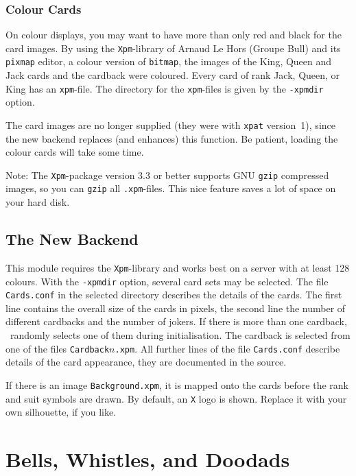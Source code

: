 \subsubsection*{Colour Cards}
On colour displays, you may want to have more than only red and black for the
card images. By using the {\tt Xpm}-library of Arnaud Le Hors (Groupe Bull)
and its {\tt pixmap} editor, a colour version of {\tt bitmap}, the images
of the King, Queen and Jack cards and the cardback were coloured.
Every card of rank Jack, Queen, or King has an {\tt xpm}-file.
The directory for the {\tt xpm}-files is given by the {\tt -xpmdir}
option.

The card images are no longer supplied (they were with {\tt xpat} version~1),
since the new backend replaces (and enhances) this function.
Be patient, loading the colour cards will take some time.

Note: The {\tt Xpm}-package version 3.3 or better
supports GNU {\tt gzip} compressed images, so you can {\tt gzip} all
{\tt .xpm}-files.
This nice feature saves a lot of space on your hard disk.


\subsection{The New Backend}
This module requires the {\tt Xpm}-library and works best on a server
with at least 128 colours. With the {\tt -xpmdir} option, several
card sets may be selected. The file {\tt Cards.conf} in the selected directory
describes the details of the cards. The first line contains the overall
size of the cards in pixels, the second line the number of different cardbacks
and the number of jokers. If there is more than one cardback,
\xpat\ randomly selects one of them during initialisation.
The cardback is selected from one of the files {\tt Cardback}$n${\tt .xpm}.
All further lines of the file {\tt Cards.conf} describe details
of the card appearance, they are documented in the source.

If there is an image {\tt Background.xpm}, it is mapped onto the cards
before the rank and suit symbols are drawn. By default, an {\tt X} logo
is shown. Replace it with your own silhouette, %
if you like.


\section{Bells, Whistles, and Doodads} %

